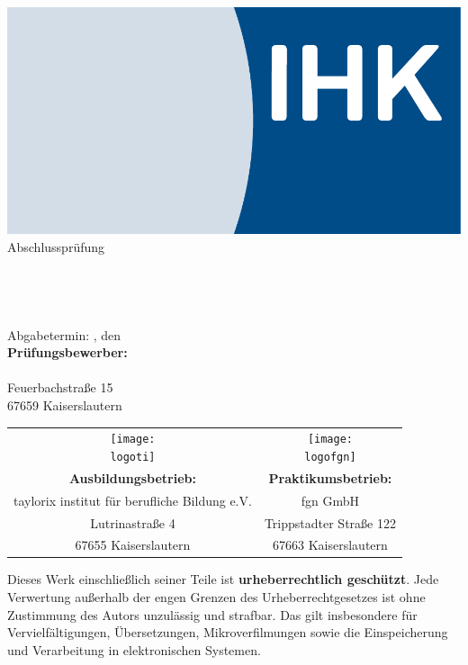 \thispagestyle{plain}
\begin{titlepage}

\begin{center}
\includegraphics[scale=0.25]{Bilder/LogoIHK.pdf}\\[1ex]
\Large{Abschlussprüfung \pruefungstermin}\\[3ex]

\Large{\ausbildungsberuf}\\
\LARGE{\betreff}\\[4ex]

\huge{\textbf{\titel}}\\[1.5ex]
\Large{\textbf{\untertitel}}\\[4ex]

\normalsize
Abgabetermin: \ort, den \abgabetermin\\[3em]
\textbf{Prüfungsbewerber:}\\
\autor\\
Feuerbachstraße 15\\
67659 Kaiserslautern\\[5ex]
\end{center}

\begin{tabularx}{\textwidth}{c c}
\texttt{[image: \\logoti]} &\texttt{[image: \\logofgn]}\\[2ex]
\textbf{Ausbildungsbetrieb:} &	\textbf{Praktikumsbetrieb:}\\
taylorix institut für berufliche Bildung e.V. &	fgn GmbH\\
Lutrinastraße 4 &	Trippstadter Straße 122\\
67655 Kaiserslautern &	67663 Kaiserslautern\\[5em]
\end{tabularx}

\small
\noindent
Dieses Werk einschließlich seiner Teile ist \textbf{urheberrechtlich geschützt}. 
Jede Verwertung außerhalb der engen Grenzen des Urheberrechtgesetzes ist ohne 
Zustimmung des Autors unzulässig und strafbar. Das gilt insbesondere für 
Vervielfältigungen, Übersetzungen, Mikroverfilmungen sowie die Einspeicherung 
und Verarbeitung in elektronischen Systemen.

\end{titlepage}
